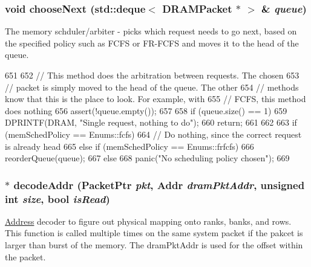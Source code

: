 \hypertarget{classDRAMCtrl_a45c15f5a90be2e23d6bde9f706db7f24}{
\subsubsection[{chooseNext}]{\setlength{\rightskip}{0pt plus 5cm}void chooseNext ({\bf std::deque}$<$ {\bf DRAMPacket} $\ast$ $>$ \& {\em queue})}}
\label{classDRAMCtrl_a45c15f5a90be2e23d6bde9f706db7f24}
The memory schduler/arbiter -\/ picks which request needs to go next, based on the specified policy such as FCFS or FR-\/FCFS and moves it to the head of the queue. 


\begin{DoxyCode}
651 {
652     // This method does the arbitration between requests. The chosen
653     // packet is simply moved to the head of the queue. The other
654     // methods know that this is the place to look. For example, with
655     // FCFS, this method does nothing
656     assert(!queue.empty());
657 
658     if (queue.size() == 1) {
659         DPRINTF(DRAM, "Single request, nothing to do\n");
660         return;
661     }
662 
663     if (memSchedPolicy == Enums::fcfs) {
664         // Do nothing, since the correct request is already head
665     } else if (memSchedPolicy == Enums::frfcfs) {
666         reorderQueue(queue);
667     } else
668         panic("No scheduling policy chosen\n");
669 }
\end{DoxyCode}
\hypertarget{classDRAMCtrl_a6d379162bc91622a9b1f1bdf82e062cc}{
\subsubsection[{decodeAddr}]{$\ast$ decodeAddr ({\bf PacketPtr} {\em pkt}, \/  {\bf Addr} {\em dramPktAddr}, \/  unsigned int {\em size}, \/  bool {\em isRead})}}
\label{classDRAMCtrl_a6d379162bc91622a9b1f1bdf82e062cc}
\hyperlink{classAddress}{Address} decoder to figure out physical mapping onto ranks, banks, and rows. This function is called multiple times on the same system packet if the pakcet is larger than burst of the memory. The dramPktAddr is used for the offset within the packet.


